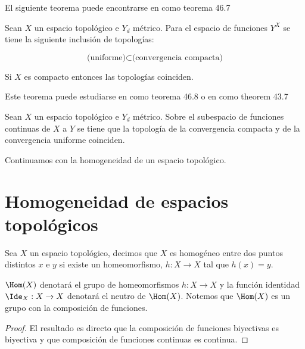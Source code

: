 El siguiente teorema puede encontrarse en \cite{top_munk} como teorema 46.7

\begin{te}
Sean $X$ un espacio topológico e $Y_d $ métrico. Para el espacio de funciones $Y^X$ se tiene la siguiente inclusión de topologías:

$$\text{(uniforme)} \subset \text{(convergencia compacta)}$$ 

Si $X$ es compacto entonces las topologías coinciden. 
\end{te}

Este teorema puede estudiarse en \cite{top_munk} como teorema 46.8 o en \cite{top_willd} como theorem 43.7

\begin{te}
Sean $X$ un espacio topológico e $Y_d $ métrico. Sobre el subespacio de funciones continuas de $X$ a $Y$ se tiene que la topología de la convergencia compacta y de la convergencia uniforme coinciden. 
\end{te}

Continuamos con la homogeneidad de un espacio topológico. 

\section*{Homogeneidad de espacios topológicos}
Sea $X$ un espacio topológico, decimos que $X$ es homogéneo entre dos puntos distintos $x$ e $y$ si existe un homeomorfismo,  $h:X \to X$ tal que $h(x)=y$.


\begin{nt} $\Hom(X)$ denotará el grupo de homeomorfismos $h:X \to X$ y la función identidad $\Ide_X:X \to X$ denotará el neutro de $\Hom(X)$. Notemos que $\Hom(X)$ es un grupo con la composición de funciones.
	\end{nt}
	
		\begin{proof}
	El resultado es directo que la composición de funciones biyectivas es biyectiva y que composición de funciones continuas es continua. 
\end{proof}
	
